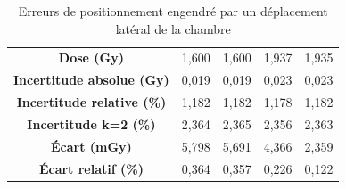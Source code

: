 \documentclass{article}
\begin{document}
\begin{table}[h]
\begin{tabular}{c|cc|cc|}
  \multicolumn{1}{|c|}{\textbf{Dose (Gy)}}                 & 1,600           & 1,600          & 1,937           & 1,935           \\
  \multicolumn{1}{|c|}{\textbf{Incertitude absolue (Gy)}}  & 0,019           & 0,019          & 0,023           & 0,023           \\
  \multicolumn{1}{|c|}{\textbf{Incertitude relative (\%)}} & 1,182           & 1,182          & 1,178           & 1,182           \\
  \multicolumn{1}{|c|}{\textbf{Incertitude k=2 (\%)}}      & 2,364           & 2,365          & 2,356           & 2,363           \\
  \multicolumn{1}{|c|}{\textbf{Écart (mGy)}}               & 5,798           & 5,691          & 4,366           & 2,359           \\
  \multicolumn{1}{|c|}{\textbf{Écart relatif (\%)}}                   & 0,364           & 0,357          & 0,226           & 0,122           \\ \hline
  \end{tabular}
  \caption{Erreurs de positionnement engendré par un déplacement latéral de la chambre}
  \label{table_erreur_lat}
\end{table}
\end{document}
